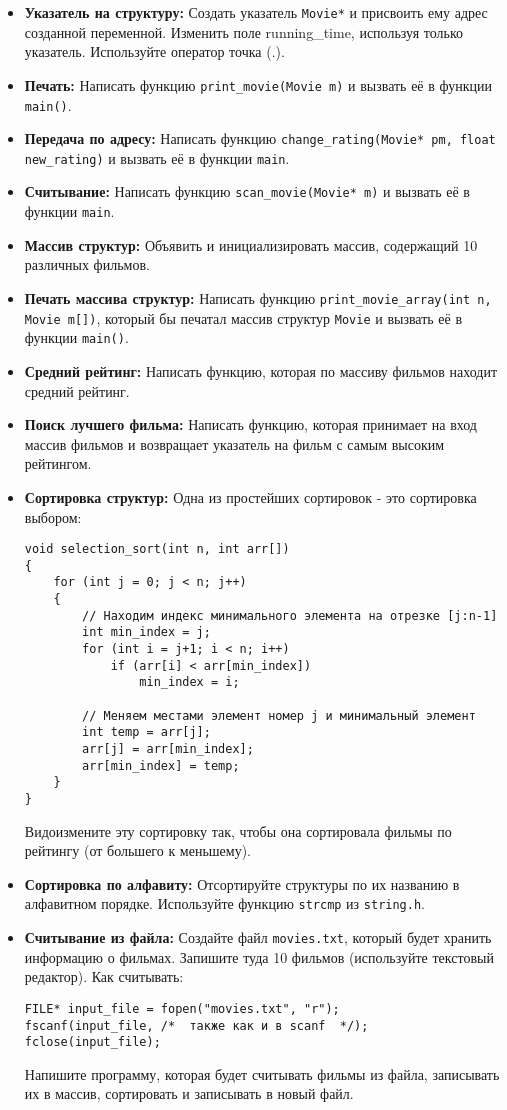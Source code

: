 \documentclass{article}
\begin{document}
\begin{enumerate}
\begin{itemize}
\item \textbf{Указатель на структуру:} Создать указатель \texttt{Movie*} и присвоить ему адрес созданной переменной.  Изменить поле running\_time, используя только указатель.  Используйте оператор точка (.).
\item \textbf{Печать:} Написать функцию \texttt{print\_movie(Movie m)} и вызвать её в функции \texttt{ main()}.
\item \textbf{Передача по адресу:} Написать функцию \texttt{change\_rating(Movie* pm, float new\_rating)} и вызвать её в функции \texttt{main}.
\item \textbf{Считывание:} Написать функцию \texttt{scan\_movie(Movie* m)} и вызвать её в функции \texttt{main}.
\item \textbf{Массив структур:} Объявить и инициализировать массив, содержащий 10 различных фильмов.
\item \textbf{Печать массива структур:} Написать функцию \texttt{print\_movie\_array(int n, Movie m[])}, который бы печатал массив структур \texttt{Movie} и вызвать её в функции \texttt{main()}.
\item \textbf{Средний рейтинг:} Написать функцию, которая по массиву фильмов находит средний рейтинг.
\item \textbf{Поиск лучшего фильма:} Написать функцию, которая принимает на вход массив фильмов и возвращает указатель на фильм с самым высоким рейтингом.
\item \textbf{Сортировка структур:} Одна из простейших сортировок - это сортировка выбором:
\begin{lstlisting}
void selection_sort(int n, int arr[])
{
	for (int j = 0; j < n; j++)
	{
		// Находим индекс минимального элемента на отрезке [j:n-1]
		int min_index = j;
		for (int i = j+1; i < n; i++)
			if (arr[i] < arr[min_index])
				min_index = i;
		
		// Меняем местами элемент номер j и минимальный элемент
		int temp = arr[j];
		arr[j] = arr[min_index];
		arr[min_index] = temp;
	}
}
\end{lstlisting}
Видоизмените эту сортировку так, чтобы она сортировала фильмы по рейтингу (от большего к меньшему).
\item \textbf{Сортировка по алфавиту:} Отсортируйте структуры по их названию в алфавитном порядке. Используйте функцию \texttt{strcmp} из \texttt{string.h}.
\item \textbf{Считывание из файла:} Создайте файл \texttt{movies.txt}, который будет хранить информацию о фильмах. Запишите туда 10 фильмов (используйте текстовый редактор). Как считывать:
\begin{lstlisting}
FILE* input_file = fopen("movies.txt", "r");
fscanf(input_file, /*  также как и в scanf  */);
fclose(input_file);
\end{lstlisting}
Напишите программу, которая будет считывать фильмы из файла, записывать их в массив, сортировать и записывать в новый файл.
\end{itemize}
\end{enumerate}
\end{document}
